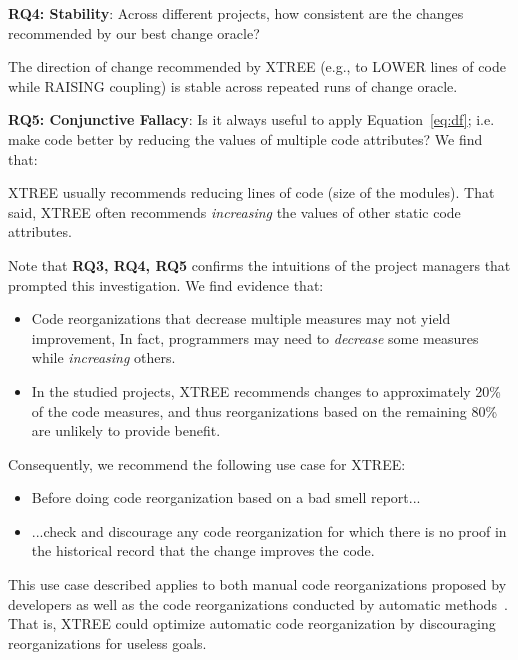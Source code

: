 \documentclass[twocolumn,5p]{elsarticle}
\newcommand{\bi}{\begin{itemize}[leftmargin=0.4cm]}
\newcommand{\ei}{\end{itemize}}
\newcommand{\eq}[1]{Equation~\ref{eq:#1}}
\theoremstyle{break}
\begin{document}
	{\bf RQ4: Stability}: Across different projects, how consistent are the changes recommended by our best change oracle?
	\begin{lesson}
		The direction of change recommended by XTREE (e.g., to LOWER lines of code while RAISING coupling) is stable across repeated runs of change oracle.  
	\end{lesson} 
	
	{\bf RQ5: Conjunctive Fallacy}:  
	Is it always  useful  to apply \eq{df}; i.e. make code better by   reducing the values of  multiple code attributes? We find that:
	\begin{lesson}
		XTREE usually recommends reducing lines of code (size of the modules).
		That said,  XTREE often recommends {\em increasing} the values of other static code attributes.
	\end{lesson} 
	Note that {\bf RQ3, RQ4, RQ5} 
	confirms the intuitions
	of the project managers that prompted this investigation. We find evidence that:
	\bi
	\item Code reorganizations that decrease multiple measures may not yield improvement, In fact,  programmers may need to {\em decrease} some measures while {\em increasing} others.
    \item In the studied projects, XTREE recommends changes to approximately 20\% of the code measures, and thus reorganizations based on the remaining 80\% are unlikely to provide benefit.
    \ei
	Consequently, we  recommend the following use case for  XTREE:
	\bi
	\item Before doing  code reorganization based on a bad smell report...
	\item ...check and discourage any code reorganization   for which there is no proof
	in the historical record that the change improves the code.
	\ei
	This use case described  applies to both manual code reorganizations proposed by developers
	as well as the code reorganizations conducted by automatic methods~\cite{mkaouer2015many}. That is, XTREE could optimize automatic
	code reorganization by discouraging reorganizations for useless goals.
	
\end{document}
